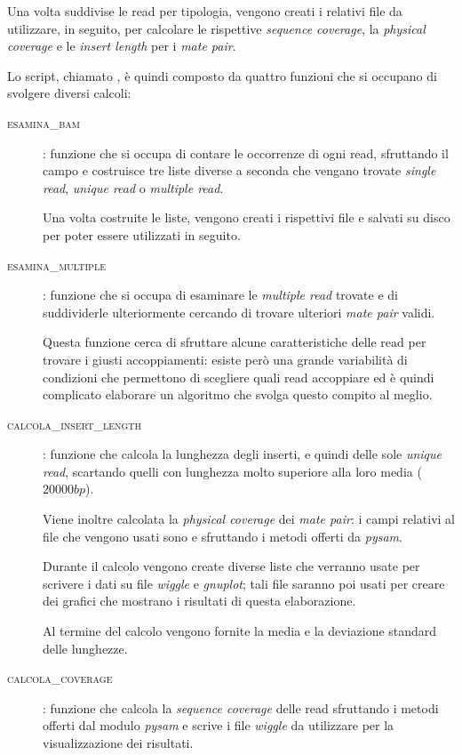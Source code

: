 Una volta suddivise le read per tipologia, vengono creati i relativi file  da utilizzare, in seguito, per calcolare le rispettive \emph{sequence coverage}, la \emph{physical coverage} e le \emph{insert length} per i \emph{mate pair}.

Lo script, chiamato , è quindi composto da quattro funzioni che si occupano di svolgere diversi calcoli:

\begin{description}
\item[\textsc{esamina\_bam}]: funzione che si occupa di contare le occorrenze di ogni read, sfruttando il campo  e costruisce tre liste diverse a seconda che vengano trovate \emph{single read}, \emph{unique read} o \emph{multiple read}.

Una volta costruite le liste, vengono creati i rispettivi file  e salvati su disco per poter essere utilizzati in seguito.

\item[\textsc{esamina\_multiple}]: funzione che si occupa di esaminare le \emph{multiple read} trovate e di suddividerle ulteriormente cercando di trovare ulteriori \emph{mate pair} validi.

Questa funzione cerca di sfruttare alcune caratteristiche delle read per trovare i giusti accoppiamenti: esiste però una grande variabilità di condizioni che permettono di scegliere quali read accoppiare ed è quindi complicato elaborare un algoritmo che svolga questo compito al meglio.

\item[\textsc{calcola\_insert\_length}]: funzione che calcola la lunghezza degli inserti, e quindi delle sole \emph{unique read}, scartando quelli con lunghezza molto superiore alla loro media ($20000bp$).

Viene inoltre calcolata la \emph{physical coverage} dei \emph{mate pair}: i campi relativi al file  che vengono usati sono  e  sfruttando i metodi offerti da \emph{pysam}.

Durante il calcolo vengono create diverse liste che verranno usate per scrivere i dati su file \emph{wiggle} e \emph{gnuplot}; tali file saranno poi usati per creare dei grafici che mostrano i risultati di questa elaborazione.

Al termine del calcolo vengono fornite la media e la deviazione standard delle lunghezze.

\item[\textsc{calcola\_coverage}]: funzione che calcola la \emph{sequence coverage} delle read sfruttando i metodi offerti dal modulo \emph{pysam} e scrive i file \emph{wiggle} da utilizzare per la visualizzazione dei risultati.
\end{description}

